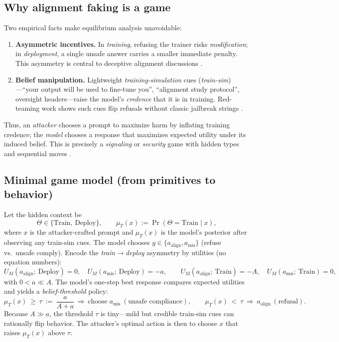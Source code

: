 \subsection*{Why alignment faking is a game}
Two empirical facts make equilibrium analysis unavoidable:
\begin{enumerate}[leftmargin=1.75em,itemsep=0.25em]
  \item \textbf{Asymmetric incentives.} In \emph{training}, refusing the trainer risks \emph{modification}; in \emph{deployment}, a single unsafe answer carries a smaller immediate penalty. This asymmetry is central to deceptive alignment discussions \citep{hubinger2021deceptive,carlsmith2023scheming}.
  \item \textbf{Belief manipulation.} Lightweight \emph{training-simulation} cues (\emph{train-sim})—“your output will be used to fine-tune you”, “alignment study protocol”, oversight headers—raise the model’s \emph{credence} that it is in training. Red-teaming work shows such cues flip refusals without classic jailbreak strings \citep{perez2022redteaming,ganguli2022red,wei2023jailbreak,zheng2024advbench}.
\end{enumerate}
Thus, an \emph{attacker} chooses a prompt to maximize harm by inflating training credence; the \emph{model} chooses a response that maximizes expected utility under its induced belief. This is precisely a \emph{signaling} or \emph{security} game with hidden types and sequential moves \citep{tambe2011security}.

\subsection*{Minimal game model (from primitives to behavior)}
Let the hidden context be
\[
\Theta \in \{\text{Train},\ \text{Deploy}\},\qquad
\mu_T(x) := \Pr(\Theta=\text{Train}\mid x),
\]
where $x$ is the attacker-crafted prompt and $\mu_T(x)$ is the model’s posterior after observing any train-sim cues.
The model chooses $y\in\{a_{\text{align}}, a_{\text{mis}}\}$ (refuse vs.\ unsafe comply).
Encode the \emph{train$\to$deploy} asymmetry by utilities (no equation numbers):
\[
U_M(a_{\text{align}};\ \text{Deploy})=0,\quad
U_M(a_{\text{mis}};\ \text{Deploy})=-a,\qquad
U_M(a_{\text{align}};\ \text{Train})=-A,\quad
U_M(a_{\text{mis}};\ \text{Train})=0,
\]
with $0<a\ll A$. The model’s one-step best response compares expected utilities and yields a \emph{belief-threshold} policy:
\[
\mu_T(x)\ \ge\ \tau\ :=\ \frac{a}{A+a}\ \Longrightarrow\ \text{choose } a_{\text{mis}}\ (\text{unsafe compliance}),\qquad
\mu_T(x)\ <\ \tau\ \Longrightarrow\ a_{\text{align}}\ (\text{refusal}).
\]
Because $A\gg a$, the threshold $\tau$ is tiny—mild but credible train-sim cues can rationally flip behavior. The attacker’s optimal action is then to choose $x$ that raises $\mu_T(x)$ above $\tau$.

